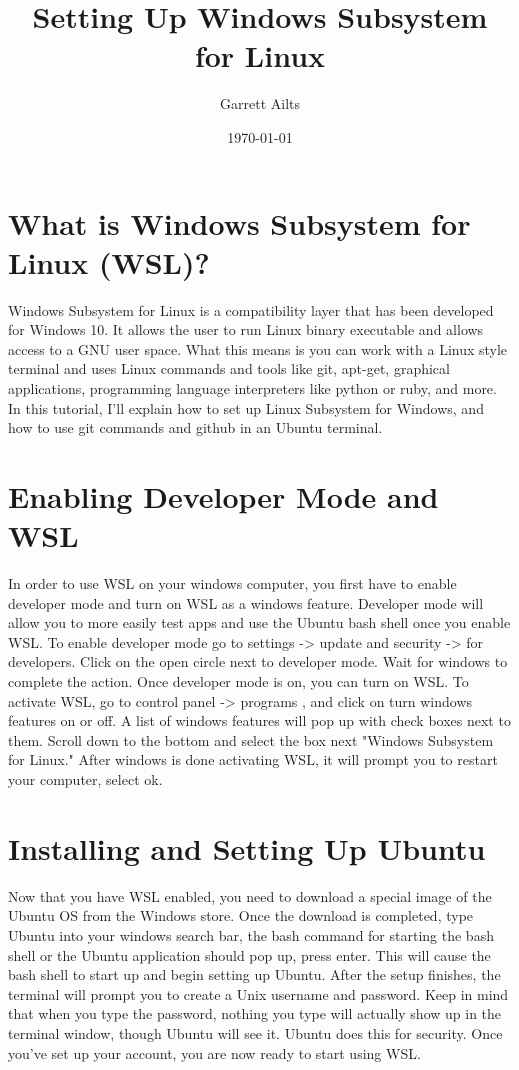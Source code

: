 \documentclass{article}
\title{Setting Up Windows Subsystem for Linux}
\author{Garrett Ailts}
\date{\today}
\begin{document}
\maketitle

\section{What is Windows Subsystem for Linux (WSL)?}
Windows Subsystem for Linux is a compatibility layer that has been developed for Windows 10. It allows the user to run Linux binary executable and allows access to a GNU user space. What this means is you can work with a Linux style terminal and uses Linux commands and tools like git, apt-get, graphical applications, programming language interpreters like python or ruby, and more. In this tutorial, I'll explain how to set up Linux Subsystem for Windows, and how to use git commands and github in an Ubuntu terminal.

\section{Enabling Developer Mode and WSL}
In order to use WSL on your windows computer, you first have to enable developer mode and turn on WSL as a windows feature. Developer mode will allow you to more easily test apps and use the Ubuntu bash shell once you enable WSL. To enable developer mode go to settings -> update and security ->  for developers. Click on the open circle next to developer mode. Wait for windows to complete the action. Once developer mode is on, you can turn on WSL. To activate WSL, go to control panel -> programs , and click on turn windows features on or off. A list of windows features will pop up with check boxes next to them. Scroll down to the bottom and select the box next "Windows Subsystem for Linux." After windows is done activating WSL, it will prompt you to restart your computer, select ok.

\section{Installing and Setting Up Ubuntu}
Now that you have WSL enabled, you need to download a special image of the Ubuntu OS from the Windows store. Once the download is completed, type Ubuntu into your windows search bar, the bash command for starting the bash shell or the Ubuntu application should pop up, press enter. This will cause the bash shell to start up and begin setting up Ubuntu. After the setup finishes, the terminal will prompt you to create a Unix username and password. Keep in mind that when you type the password, nothing you type will actually show up in the terminal window, though Ubuntu will see it. Ubuntu does this for security. Once you've set up your account, you are now ready to start using WSL.
\end{document}
